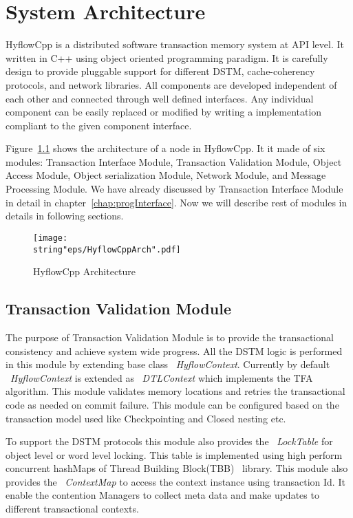 \documentclass[12pt,english]{report}
\begin{document}
\chapter{System Architecture}\label{chap:sysArch}

HyflowCpp is a distributed software transaction memory system at API level. It written in C++ using object oriented programming paradigm. It is carefully design to provide pluggable support for different DSTM, cache-coherency protocols, and network libraries. All components are developed independent of each other and connected through well defined interfaces. Any individual component can be easily replaced or modified by writing a implementation compliant to the given component interface. 

Figure~\ref{Fig:HyflowCppArch} shows the architecture of a node in HyflowCpp. It it made of six modules: Transaction Interface Module, Transaction Validation Module, Object Access Module, Object serialization Module, Network Module, and Message Processing Module. We have already discussed by Transaction Interface Module in detail in chapter~\ref{chap:progInterface}. Now we will describe rest of modules in details in following sections.

\begin{figure}
\begin{minipage}[b]{0.9\linewidth}\centering
\centering \texttt{[image: \\string"eps/HyflowCppArch".pdf]}
\caption{HyflowCpp Architecture}
\label{Fig:HyflowCppArch}
\end{minipage}
\end{figure}

\section{Transaction Validation Module}

The purpose of Transaction Validation Module is to provide the transactional consistency and achieve system wide progress. All the DSTM logic is performed in this module by extending base class ~\emph{HyflowContext}. Currently by default ~\emph{HyflowContext} is extended as ~\emph{DTLContext} which implements the TFA algorithm. This module validates memory locations and retries the transactional code as needed on commit failure. This module can be configured based on the transaction model used like Checkpointing and Closed nesting etc. 

To support the DSTM protocols this module also provides the ~\emph{LockTable} for object level or word level locking. This table is implemented using high perform concurrent hashMaps of Thread Building Block(TBB)~\cite{willhalm2008putting} library. This module also provides the ~\emph{ContextMap} to access the context instance using transaction Id. It enable the contention Managers to collect meta data and make updates to different transactional contexts.
\end{document}
